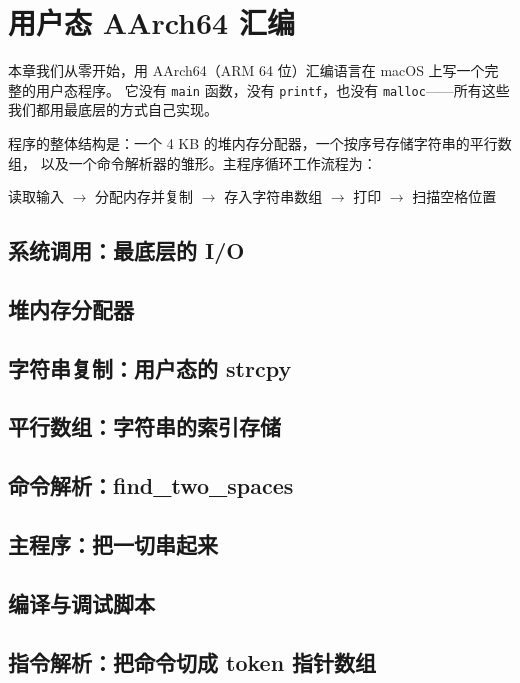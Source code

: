 \chapter{用户态 AArch64 汇编}

本章我们从零开始，用 AArch64（ARM 64 位）汇编语言在 macOS 上写一个完整的用户态程序。
它没有 \texttt{main} 函数，没有 \texttt{printf}，也没有 \texttt{malloc}——所有这些
我们都用最底层的方式自己实现。

程序的整体结构是：一个 4 KB 的堆内存分配器，一个按序号存储字符串的平行数组，
以及一个命令解析器的雏形。主程序循环工作流程为：
\begin{center}
    读取输入 \(\rightarrow\) 分配内存并复制 \(\rightarrow\)
    存入字符串数组 \(\rightarrow\) 打印 \(\rightarrow\) 扫描空格位置
\end{center}

\section{系统调用：最底层的 I/O}


\section{堆内存分配器}


\section{字符串复制：用户态的 strcpy}


\section{平行数组：字符串的索引存储}


\section{命令解析：find\_two\_spaces}


\section{主程序：把一切串起来}


\section{编译与调试脚本}


\section{指令解析：把命令切成 token 指针数组}

